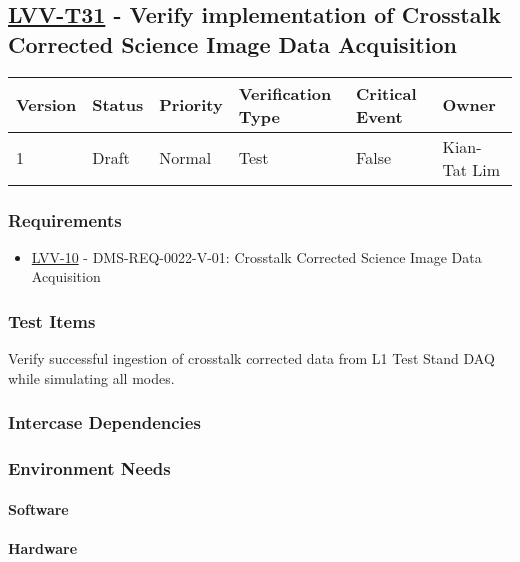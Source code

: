 \subsection{\href{https://jira.lsstcorp.org/secure/Tests.jspa\#/testCase/LVV-T31}{LVV-T31}
    - Verify implementation of Crosstalk Corrected Science Image Data Acquisition}\label{lvv-t31}

\begin{longtable}[]{llllll}
\toprule
Version & Status & Priority & Verification Type & Critical Event & Owner
\\\midrule
1 & Draft & Normal &
Test & False & Kian-Tat Lim
\\\bottomrule
\end{longtable}

\subsubsection{Requirements}
\begin{itemize}
\item \href{https://jira.lsstcorp.org/browse/LVV-10}{LVV-10} - DMS-REQ-0022-V-01: Crosstalk Corrected Science Image Data Acquisition
\end{itemize}

\subsubsection{Test Items}
Verify successful ingestion of crosstalk corrected data from L1 Test
Stand DAQ while simulating all modes.



\subsubsection{Intercase Dependencies}

\subsubsection{Environment Needs}

\paragraph{Software}

\paragraph{Hardware}

